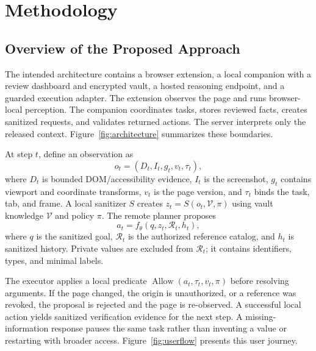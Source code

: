 \documentclass[conference]{IEEEtran}
\begin{document}
\section{Methodology}
\subsection{Overview of the Proposed Approach}
The intended architecture contains a browser extension, a local companion with a review dashboard and encrypted vault, a hosted reasoning endpoint, and a guarded execution adapter. The extension observes the page and runs browser-local perception. The companion coordinates tasks, stores reviewed facts, creates sanitized requests, and validates returned actions. The server interprets only the released context. Figure~\ref{fig:architecture} summarizes these boundaries.

At step $t$, define an observation as
\begin{equation}
 o_t=(D_t,I_t,g_t,v_t,\tau_t),
\end{equation}
where $D_t$ is bounded DOM/accessibility evidence, $I_t$ is the screenshot, $g_t$ contains viewport and coordinate transforms, $v_t$ is the page version, and $\tau_t$ binds the task, tab, and frame. A local sanitizer $S$ creates $z_t=S(o_t,\mathcal{V},\pi)$ using vault knowledge $\mathcal{V}$ and policy $\pi$. The remote planner proposes
\begin{equation}
 a_t=f_{\theta}(q,z_t,\mathcal{R}_t,h_t),
\end{equation}
where $q$ is the sanitized goal, $\mathcal{R}_t$ is the authorized reference catalog, and $h_t$ is sanitized history. Private values are excluded from $\mathcal{R}_t$; it contains identifiers, types, and minimal labels.

The executor applies a local predicate $\operatorname{Allow}(a_t,\tau_t,v_t,\pi)$ before resolving arguments. If the page changed, the origin is unauthorized, or a reference was revoked, the proposal is rejected and the page is re-observed. A successful local action yields sanitized verification evidence for the next step. A missing-information response pauses the same task rather than inventing a value or restarting with broader access. Figure~\ref{fig:userflow} presents this user journey.
\end{document}
